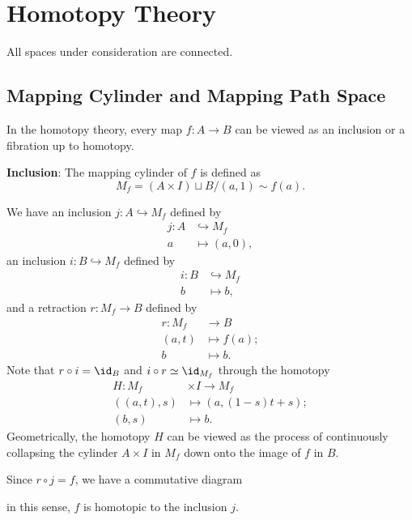 \chapter{Homotopy Theory}

All spaces under consideration are connected.

\section{Mapping Cylinder and Mapping Path Space}
    In the homotopy theory, every map $f: A \to B$ 
    can be viewed as an inclusion or a fibration up to homotopy. 

    \textbf{Inclusion}:
    The mapping cylinder of $f$ is defined as
    \begin{equation*}
        M_f = (A\times I)\sqcup B\big/(a,1)\sim f(a).
    \end{equation*}
    
    We have an inclusion $j: A\hookrightarrow M_f$ defined by 
    \begin{align*}
        j:A&\hookrightarrow M_f \\
        a &\mapsto(a,0),
    \end{align*}
    an inclusion $i: B\hookrightarrow M_f$ defined by
    \begin{align*}
        i:B&\hookrightarrow M_f \\
        b &\mapsto b,
    \end{align*}
    and a retraction $r: M_f \to B$ defined by
    \begin{align*}
        r:M_f&\to B \\
        (a,t) &\mapsto f(a); \\
        b &\mapsto b.
    \end{align*}
    Note that $r\circ i = \id_B$ and $i\circ r \simeq \id_{M_f}$ 
    through the homotopy
    \begin{align*}
        H: M_f &\times I \to M_f \\
        ((a,t),s) &\mapsto (a,(1-s)t+s); \\
        (b,s) &\mapsto b. 
    \end{align*}
    Geometrically, the homotopy $H$ can be viewed as 
    the process of continuously collapsing 
    the cylinder $A\times I$ in $M_f$ down onto 
    the image of $f$ in $B$.

    Since $r\circ j = f$, we have a commutative diagram
    \begin{center}
    \end{center}
    in this sense, $f$ is homotopic to the inclusion $j$.

